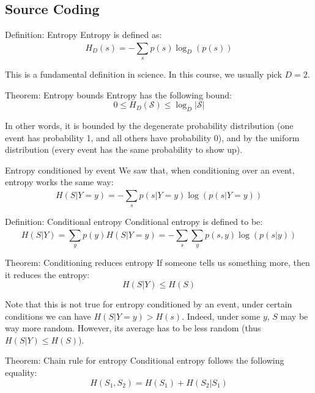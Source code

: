 \documentclass[a4paper]{article}
\begin{document}
\subsection{Source Coding}
\begin{parag}{Definition: Entropy}
    Entropy is defined as: 
    \[H_D\left(s\right) = -\sum_{s}^{} p\left(s\right) \log_D\left(p\left(s\right)\right)\]
    
    This is a fundamental definition in science. In this course, we usually pick $D = 2$.
\end{parag}

\begin{parag}{Theorem: Entropy bounds}
    Entropy has the following bound: 
    \[0 \leq H_D\left(\mathcal{S}\right) \leq \log_D \left|\mathcal{S}\right|\]

    In other words, it is bounded by the degenerate probability distribution (one event has probability 1, and all others have probability 0), and by the uniform distribution (every event has the same probability to show up).
\end{parag}

\begin{parag}{Entropy conditioned by event}
    We saw that, when conditioning over an event, entropy works the same way: 
    \[H\left(S | Y = y\right) = -\sum_{s}^{} p\left(s|Y=y\right) \log\left(p\left(s | Y = y\right)\right)\]
\end{parag}

\begin{parag}{Definition: Conditional entropy}
    Conditional entropy is defined to be: 
    \[H\left(S|Y\right) = \sum_{y}^{} p\left(y\right) H\left(S | Y=y\right) = -\sum_{s}^{} \sum_{y}^{} p\left(s, y\right) \log\left(p\left(s|y\right)\right)\]
\end{parag}

\begin{parag}{Theorem: Conditioning reduces entropy}
    If someone tells us something more, then it reduces the entropy: 
    \[H\left(S | Y\right) \leq H\left(S\right)\]
    
    Note that this is not true for entropy conditioned by an event, under certain conditions we can have $H\left(S | Y=y\right) > H\left(s\right)$. Indeed, under some $y$, $S$ may be way more random. However, its average has to be less random (thus $H\left(S |Y\right) \leq H\left(S\right)$).
\end{parag}

\begin{parag}{Theorem: Chain rule for entropy}
    Conditional entropy follows the following equality: 
    \[H\left(S_1, S_2\right) = H\left(S_1\right) + H\left(S_2 | S_1\right)\]
\end{parag}
\end{document}
